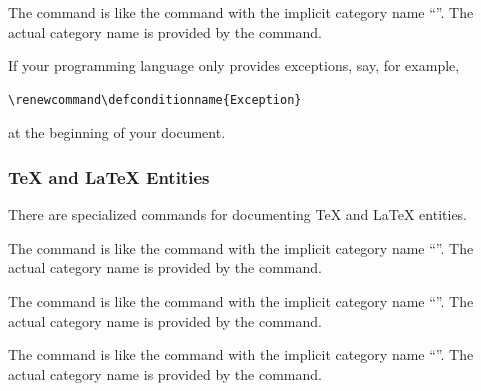 \documentclass{scrartcl}
\begin{document}
{%
\begin{definition}
 
The  command is like the  command
with the implicit category name “”.  The actual
category name is provided by the  command.
\end{definition}

If your programming language only provides exceptions, say, for
example,
\begin{display}
\begin{verbatim}
\renewcommand\defconditionname{Exception}
\end{verbatim}
\end{display}
at the beginning of your document.


\subsubsection{\TeX{} and \LaTeX{} Entities}

There are specialized commands for documenting \TeX{} and \LaTeX{}
entities.

\begin{definition}
  
The  command is like the  command with the
implicit category name “”.  The actual category name is
provided by the  command.
\end{definition}

\begin{definition}
  
The  command is like the  command with the
implicit category name “”.  The actual category name is
provided by the  command.
\end{definition}

\begin{definition}
 
The  command is like the  command with
the implicit category name “”.  The actual category name
is provided by the  command.
\end{definition}

}
\end{document}
